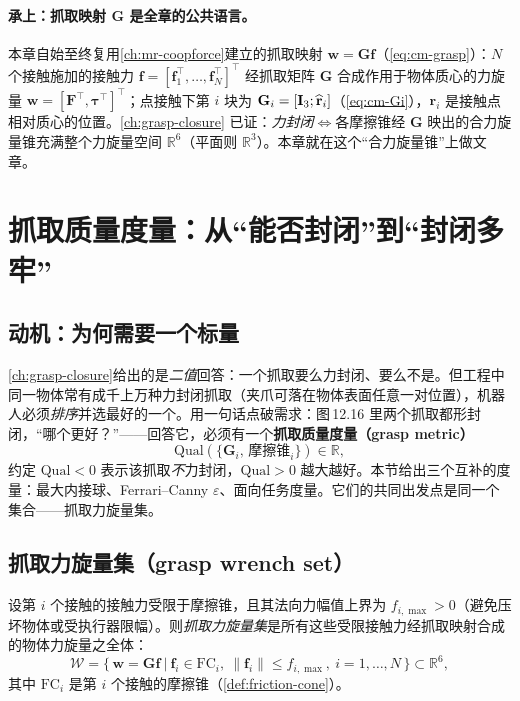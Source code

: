 \paragraph{承上：抓取映射 $\mathbf{G}$ 是全章的公共语言。}本章自始至终复用\cref{ch:mr-coopforce}建立的抓取映射 $\mathbf{w}=\mathbf{G}\mathbf{f}$（\cref{eq:cm-grasp}）：$N$ 个接触施加的接触力 $\mathbf{f}=[\mathbf{f}_1^\top,\dots,\mathbf{f}_N^\top]^\top$ 经抓取矩阵 $\mathbf{G}$ 合成作用于物体质心的力旋量 $\mathbf{w}=[\mathbf{F}^\top,\boldsymbol{\tau}^\top]^\top$；点接触下第 $i$ 块为 $\mathbf{G}_i=[\mathbf{I}_3;\widehat{\mathbf{r}}_i]$（\cref{eq:cm-Gi}），$\mathbf{r}_i$ 是接触点相对质心的位置。\cref{ch:grasp-closure} 已证：\emph{力封闭}$\iff$各摩擦锥经 $\mathbf{G}$ 映出的合力旋量锥充满整个力旋量空间 $\mathbb{R}^6$（平面则 $\mathbb{R}^3$）。本章就在这个“合力旋量锥”上做文章。

\section{抓取质量度量：从“能否封闭”到“封闭多牢”}
\label{sec:gp-quality}

\subsection{动机：为何需要一个标量}
\cref{ch:grasp-closure}给出的是\emph{二值}回答：一个抓取要么力封闭、要么不是。但工程中同一物体常有成千上万种力封闭抓取（夹爪可落在物体表面任意一对位置），机器人必须\emph{排序}并选最好的一个。\citeauthor{lynch2017modern}\cite{lynch2017modern}用一句话点破需求：图\,12.16 里两个抓取都形封闭，“哪个更好？”——回答它，必须有一个\textbf{抓取质量度量（grasp metric）}
\begin{equation}
  \mathrm{Qual}(\{\mathbf{G}_i,\,\text{摩擦锥}_i\})\in\mathbb{R},
  \label{eq:gp-qual-map}
\end{equation}
约定 $\mathrm{Qual}<0$ 表示该抓取\emph{不}力封闭，$\mathrm{Qual}>0$ 越大越好。本节给出三个互补的度量：最大内接球、Ferrari--Canny $\varepsilon$、面向任务度量。它们的共同出发点是同一个集合——抓取力旋量集。

\subsection{抓取力旋量集（grasp wrench set）}
\begin{definition}[抓取力旋量集]\label{def:gp-gws}
设第 $i$ 个接触的接触力受限于摩擦锥，且其法向力幅值上界为 $f_{i,\max}>0$（避免压坏物体或受执行器限幅）。则\emph{抓取力旋量集}是所有这些受限接触力经抓取映射合成的物体力旋量之全体：
\begin{equation}
  \mathcal{W}=\Big\{\,\mathbf{w}=\mathbf{G}\mathbf{f}\ \Big|\ \mathbf{f}_i\in\mathrm{FC}_i,\ \|\mathbf{f}_i\|\le f_{i,\max},\ i=1,\dots,N\,\Big\}\subset\mathbb{R}^6,
  \label{eq:gp-gws}
\end{equation}
其中 $\mathrm{FC}_i$ 是第 $i$ 个接触的摩擦锥（\cref{def:friction-cone}）。
\end{definition}

